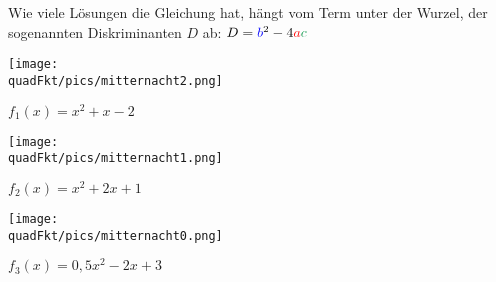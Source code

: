 Wie viele Lösungen die Gleichung hat, hängt vom Term unter der Wurzel, der sogenannten Diskriminanten \(D\) ab:
\(D=\textcolor{blue}{b}^2-4 \textcolor{red}{a}  \textcolor{ForestGreen}{c}\)

\bigskip

\begin{minipage}{\textwidth}
	\begin{minipage}{0.33\textwidth}

		\texttt{[image: \\quadFkt/pics/mitternacht2.png]}

		\(f_1(x)=x^2+x-2\)
	\end{minipage}%
	\begin{minipage}{0.33\textwidth}

		\texttt{[image: \\quadFkt/pics/mitternacht1.png]}

		\(f_2(x)=x^2+2x+1\)
	\end{minipage}%
	\begin{minipage}{0.33\textwidth}

		\texttt{[image: \\quadFkt/pics/mitternacht0.png]}

		\(f_3(x)=0,5x^2-2x+3\)
	\end{minipage}%
\end{minipage}

\bigskip

\begin{minipage}{\textwidth}
	\begin{minipage}{0.33\textwidth}
		\centering{\(\textcolor{loes}{x^2+x-2=0}\)}
	\end{minipage}%
	\begin{minipage}{0.33\textwidth}
		\centering{\(\textcolor{loes}{x^2+2x+1=0}\)}
	\end{minipage}%
	\begin{minipage}{0.33\textwidth}
		\centering{\(\textcolor{loes}{0,5x^2+2x+3=0}\)}
	\end{minipage}%
\end{minipage}

\bigskip

